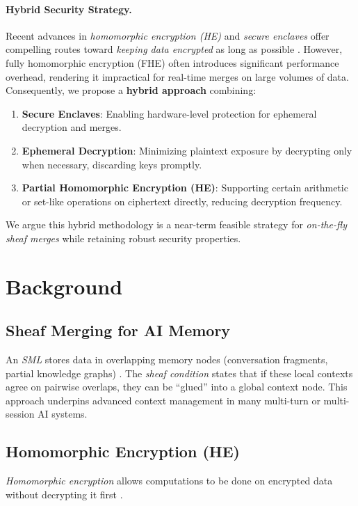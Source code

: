 \documentclass{article}
\begin{document}
\paragraph{Hybrid Security Strategy.}
Recent advances in \emph{homomorphic encryption (HE)} and \emph{secure enclaves} offer compelling routes toward \emph{keeping data encrypted} as long as possible \citep{gentry2009fully, costan2016intel}. However, fully homomorphic encryption (FHE) often introduces significant performance overhead, rendering it impractical for real-time merges on large volumes of data. Consequently, we propose a \textbf{hybrid approach} combining:
\begin{enumerate}
    \item \textbf{Secure Enclaves}: Enabling hardware-level protection for ephemeral decryption and merges.
    \item \textbf{Ephemeral Decryption}: Minimizing plaintext exposure by decrypting only when necessary, discarding keys promptly.
    \item \textbf{Partial Homomorphic Encryption (HE)}: Supporting certain arithmetic or set-like operations on ciphertext directly, reducing decryption frequency.
\end{enumerate}

We argue this hybrid methodology is a near-term feasible strategy for \emph{on-the-fly sheaf merges} while retaining robust security properties.

\section{Background}
\label{sec:background}

\subsection{Sheaf Merging for AI Memory}
An \emph{SML} stores data in overlapping memory nodes (conversation fragments, partial knowledge graphs) \citep{toposmemorytransformers2025}. The \emph{sheaf condition} states that if these local contexts agree on pairwise overlaps, they can be “glued” into a global context node. This approach underpins advanced context management in many multi-turn or multi-session AI systems.

\subsection{Homomorphic Encryption (HE)}
\emph{Homomorphic encryption} allows computations to be done on encrypted data without decrypting it first \citep{gentry2009fully}.  
\end{document}
